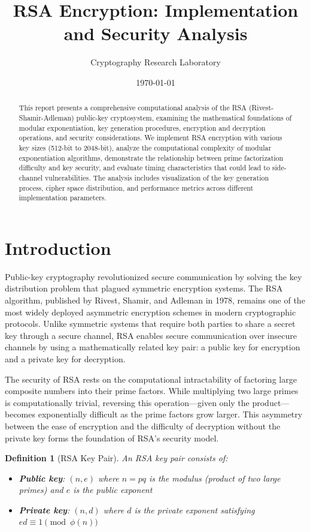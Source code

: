 \documentclass[a4paper, 11pt]{article}
\title{RSA Encryption: Implementation and Security Analysis}
\author{Cryptography Research Laboratory}
\date{\today}
\newtheorem{definition}{Definition}[section]
\begin{document}
\maketitle

\begin{abstract}
This report presents a comprehensive computational analysis of the RSA (Rivest-Shamir-Adleman)
public-key cryptosystem, examining the mathematical foundations of modular exponentiation,
key generation procedures, encryption and decryption operations, and security considerations.
We implement RSA encryption with various key sizes (512-bit to 2048-bit), analyze the
computational complexity of modular exponentiation algorithms, demonstrate the relationship
between prime factorization difficulty and key security, and evaluate timing characteristics
that could lead to side-channel vulnerabilities. The analysis includes visualization of the
key generation process, cipher space distribution, and performance metrics across different
implementation parameters.
\end{abstract}

\section{Introduction}

Public-key cryptography revolutionized secure communication by solving the key distribution
problem that plagued symmetric encryption systems. The RSA algorithm, published by Rivest,
Shamir, and Adleman in 1978, remains one of the most widely deployed asymmetric encryption
schemes in modern cryptographic protocols. Unlike symmetric systems that require both parties
to share a secret key through a secure channel, RSA enables secure communication over
insecure channels by using a mathematically related key pair: a public key for encryption
and a private key for decryption.

The security of RSA rests on the computational intractability of factoring large composite
numbers into their prime factors. While multiplying two large primes is computationally
trivial, reversing this operation—given only the product—becomes exponentially difficult as
the prime factors grow larger. This asymmetry between the ease of encryption and the
difficulty of decryption without the private key forms the foundation of RSA's security model.

\begin{definition}[RSA Key Pair]
An RSA key pair consists of:
\begin{itemize}
\item \textbf{Public key}: $(n, e)$ where $n = pq$ is the modulus (product of two large primes)
and $e$ is the public exponent
\item \textbf{Private key}: $(n, d)$ where $d$ is the private exponent satisfying
$ed \equiv 1 \pmod{\phi(n)}$
\end{itemize}
\end{definition}
\end{document}
